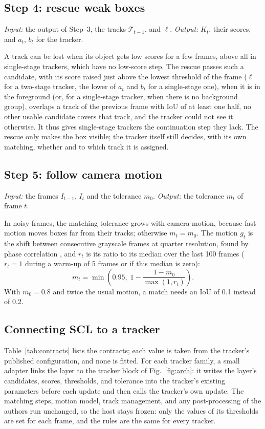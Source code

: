 \documentclass[pdflatex,sn-mathphys-num,iicol]{sn-jnl}
\begin{document}
\subsection{Step 4: rescue weak boxes}\label{sec:rescue}
\emph{Input:} the output of Step~3, the tracks $\mathcal{T}_{t-1}$, and $\ell$. \emph{Output:}
$K_t$, their scores, and $a_t$, $b_t$ for the tracker.

A track can be lost when its object gets low scores for a few frames, above all in single-stage
trackers, which have no low-score step. The rescue passes such a candidate, with its score raised
just above the lowest threshold of the frame ($\ell$ for a two-stage tracker, the lower of $a_t$
and $b_t$ for a single-stage one), when it is in the foreground (or, for a single-stage tracker,
when there is no background group), overlaps a track of the previous frame with IoU of at least
one half, no other usable candidate covers that track, and the tracker could not see it otherwise.
It thus gives single-stage trackers the continuation step they lack. The rescue only makes the box
visible; the tracker itself still decides, with its own matching, whether and to which track it is
assigned.

\subsection{Step 5: follow camera motion}\label{sec:motion}
\emph{Input:} the frames $I_{t-1}$, $I_t$ and the tolerance $m_0$. \emph{Output:} the tolerance
$m_t$ of frame $t$.

In noisy frames, the matching tolerance grows with camera motion, because fast motion moves boxes
far from their tracks; otherwise $m_t=m_0$. The motion $g_t$ is the shift between consecutive
grayscale frames at quarter resolution, found by phase correlation \cite{reddy1996phasecorr}, and
$r_t$ is its ratio to its median over the last 100 frames ($r_t=1$ during a warm-up of 5 frames or
if this median is zero):
\begin{equation}
m_t=\min\!\left(0.95,\;1-\frac{1-m_0}{\max(1,r_t)}\right).
\label{eq:motion}
\end{equation}
With $m_0=0.8$ and twice the usual motion, a match needs an IoU of 0.1 instead of 0.2.

\subsection{Connecting SCL to a tracker}\label{sec:contract}
Table~\ref{tab:contracts} lists the contracts; each value is taken from the tracker's published
configuration, and none is fitted. For each tracker family, a small adapter links the layer to the
tracker block of Fig.~\ref{fig:arch}: it writes the layer's candidates, scores, thresholds, and
tolerance into the tracker's existing parameters before each update and then calls the tracker's
own update. The matching steps, motion model, track management, and any post-processing of the
authors run unchanged, so the host stays frozen: only the values of its thresholds are set for
each frame, and the rules are the same for every tracker.
\end{document}
